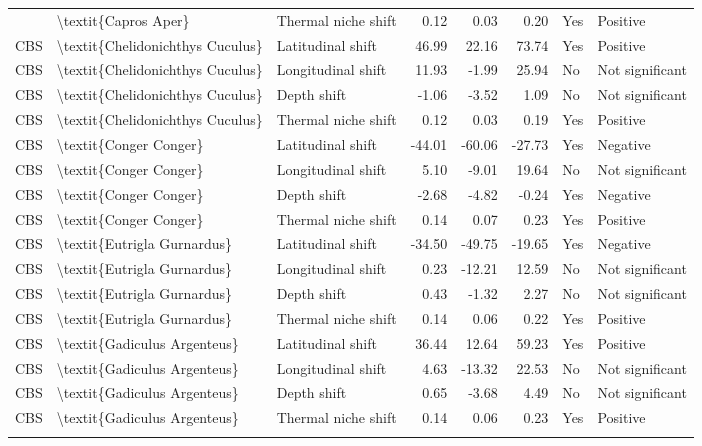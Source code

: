 \begin{longtable}[t]{lllrrrll}
{{CBS & \textbackslash{}textit\{Capros Aper\} & Thermal niche shift & 0.12 & 0.03 & 0.20 & Yes & Positive\\
\addlinespace
CBS & \textbackslash{}textit\{Chelidonichthys Cuculus\} & Latitudinal shift & 46.99 & 22.16 & 73.74 & Yes & Positive\\
CBS & \textbackslash{}textit\{Chelidonichthys Cuculus\} & Longitudinal shift & 11.93 & -1.99 & 25.94 & No & Not significant\\
CBS & \textbackslash{}textit\{Chelidonichthys Cuculus\} & Depth shift & -1.06 & -3.52 & 1.09 & No & Not significant\\
CBS & \textbackslash{}textit\{Chelidonichthys Cuculus\} & Thermal niche shift & 0.12 & 0.03 & 0.19 & Yes & Positive\\
CBS & \textbackslash{}textit\{Conger Conger\} & Latitudinal shift & -44.01 & -60.06 & -27.73 & Yes & Negative\\
\addlinespace
CBS & \textbackslash{}textit\{Conger Conger\} & Longitudinal shift & 5.10 & -9.01 & 19.64 & No & Not significant\\
CBS & \textbackslash{}textit\{Conger Conger\} & Depth shift & -2.68 & -4.82 & -0.24 & Yes & Negative\\
CBS & \textbackslash{}textit\{Conger Conger\} & Thermal niche shift & 0.14 & 0.07 & 0.23 & Yes & Positive\\
CBS & \textbackslash{}textit\{Eutrigla Gurnardus\} & Latitudinal shift & -34.50 & -49.75 & -19.65 & Yes & Negative\\
CBS & \textbackslash{}textit\{Eutrigla Gurnardus\} & Longitudinal shift & 0.23 & -12.21 & 12.59 & No & Not significant\\
\addlinespace
CBS & \textbackslash{}textit\{Eutrigla Gurnardus\} & Depth shift & 0.43 & -1.32 & 2.27 & No & Not significant\\
CBS & \textbackslash{}textit\{Eutrigla Gurnardus\} & Thermal niche shift & 0.14 & 0.06 & 0.22 & Yes & Positive\\
CBS & \textbackslash{}textit\{Gadiculus Argenteus\} & Latitudinal shift & 36.44 & 12.64 & 59.23 & Yes & Positive\\
CBS & \textbackslash{}textit\{Gadiculus Argenteus\} & Longitudinal shift & 4.63 & -13.32 & 22.53 & No & Not significant\\
CBS & \textbackslash{}textit\{Gadiculus Argenteus\} & Depth shift & 0.65 & -3.68 & 4.49 & No & Not significant\\
\addlinespace
CBS & \textbackslash{}textit\{Gadiculus Argenteus\} & Thermal niche shift & 0.14 & 0.06 & 0.23 & Yes & Positive\\
}}
\end{longtable}
